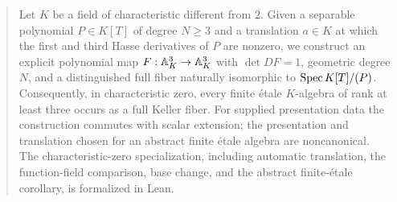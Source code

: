 \begin{abstract}
Let \(K\) be a field of characteristic different from \(2\).  Given a
separable polynomial \(P\in K[T]\) of degree \(N\geq3\) and a translation
\(a\in K\) at which the first and third Hasse derivatives of \(P\) are
nonzero, we construct an explicit polynomial map
\(F:\A^3_K\to\A^3_K\) with \(\det DF=1\), geometric degree \(N\), and a
distinguished full fiber naturally isomorphic to \(\Spec K[T]/(P)\).
Consequently, in characteristic zero, every finite \'etale \(K\)-algebra of
rank at least three occurs as a full Keller fiber.  For supplied presentation
data the construction commutes with scalar extension; the presentation and
translation chosen for an abstract finite \'etale algebra are noncanonical.
The characteristic-zero specialization, including automatic translation,
the function-field comparison, base change, and the abstract finite-\'etale
corollary, is formalized in Lean.
\end{abstract}
